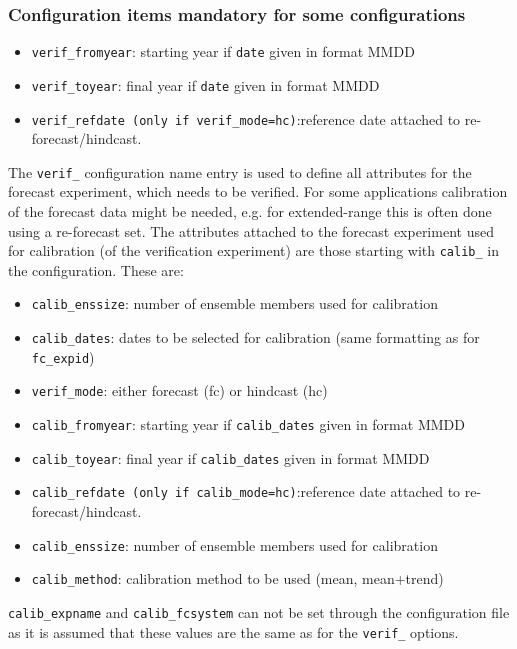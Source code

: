 \documentclass[DIV=10, parskip=full]{scrreprt}
\begin{document}
\subsubsection{Configuration items mandatory for some configurations}
\begin{itemize}
	\item \texttt{verif\_fromyear}: starting year if \texttt{date} given in format MMDD
	\item \texttt{verif\_toyear}: final year if \texttt{date} given in format MMDD
	\item \texttt{verif\_refdate (only if \texttt{verif\_mode=hc})}:reference date attached to re-forecast/hindcast. 
\end{itemize}
The \texttt{verif\_} configuration name entry is used to define all attributes for the forecast experiment, which needs to be verified. For some applications calibration of the forecast data might be needed, e.g. for extended-range this is often done using a re-forecast set. The attributes attached to the forecast experiment used for calibration (of the verification experiment) are those starting with  \texttt{calib\_} in the configuration. These are:
\begin{itemize}
	\item \texttt{calib\_enssize}: number of ensemble members used for calibration 
	\item \texttt{calib\_dates}: dates to be selected for calibration (same formatting as for \texttt{fc\_expid})
	\item \texttt{verif\_mode}: either forecast (fc) or hindcast (hc)
	\item \texttt{calib\_fromyear}: starting year if \texttt{calib\_dates} given in format MMDD
	\item \texttt{calib\_toyear}: final year if \texttt{calib\_dates} given in format MMDD
	\item \texttt{calib\_refdate (only if \texttt{calib\_mode=hc})}:reference date attached to re-forecast/hindcast. 
	\item \texttt{calib\_enssize}: number of ensemble members used for calibration 
	\item \texttt{calib\_method}: calibration method to be used (mean, mean+trend)
\end{itemize}

\texttt{calib\_expname} and \texttt{calib\_fcsystem} can not be set through the configuration file as it is assumed that these values are the same as for the \texttt{verif\_} options. \\
\end{document}
